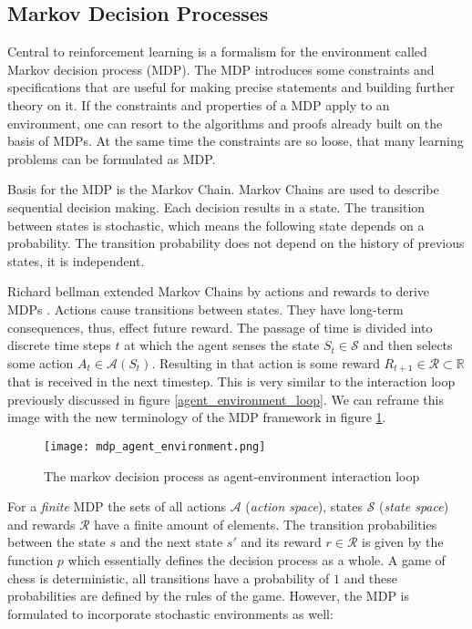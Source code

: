 \subsection{Markov Decision Processes}
Central to reinforcement learning is a formalism for the environment called Markov decision process (MDP). The MDP introduces some constraints and specifications that are useful for making precise statements and building further theory on it. If the constraints and properties of a MDP apply to an environment, one can resort to the algorithms and proofs already built on the basis of MDPs. At the same time the constraints are so loose, that many learning problems can be formulated as MDP.

Basis for the MDP is the Markov Chain. Markov Chains are used to describe sequential decision making. Each decision results in a state. The transition between states is stochastic, which means the following state depends on a probability. The transition probability does not depend on the history of previous states, it is independent.

Richard bellman extended Markov Chains by actions and rewards to derive MDPs \cite{yang_markov_2019, bellman_markovian_1957}. Actions cause transitions between states. They have long-term consequences, thus, effect future reward. The passage of time is divided into discrete time steps $ t $ at which the agent senses the state $ S_t \in \mathcal{S} $ and then selects some action $ A_t \in \mathcal{A}(S_t) $. Resulting in that action is some reward $ R_{t+1} \in \mathcal{R} \subset \mathbb{R} $ that is received in the next timestep. This is very similar to the interaction loop previously discussed in figure \ref{agent_environment_loop}. We can reframe this image with the new terminology of the MDP framework in figure \ref{mdp_agent_environment}.

\begin{figure}
    \centering
    \texttt{[image: mdp\_agent\_environment.png]}
    \caption{The markov decision process as agent-environment interaction loop \cite[cf. p. 48]{sutton_reinforcement_2018}}
    \label{mdp_agent_environment}
\end{figure}

For a \textit{finite} MDP the sets of all actions $ \mathcal{A}$ (\textit{action space}), states $\mathcal{S}$ (\textit{state space}) and rewards $ \mathcal{R} $ have a finite amount of elements. The transition probabilities between the state $ s $ and the next state $ s' $ and its reward $r \in \mathcal{R}$ is given by the function $ p $ which essentially defines the decision process as a whole. A game of chess is deterministic, all transitions have a probability of $1$ and these probabilities are defined by the rules of the game. However, the MDP is formulated to incorporate stochastic environments as well:

